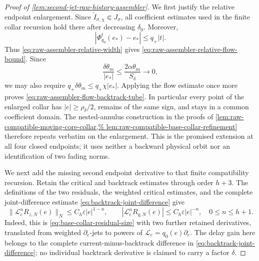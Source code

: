 \begin{proof}[Proof of
\cref{lem:second-jet-raw-history-assembler}]
We first justify the relative endpoint enlargement.  Since
\(\widetilde I_{\sigma,\chi}\Subset J_\sigma\), all coefficient estimates
used in the finite collar recursion hold there after decreasing
\(\delta_0\).  Moreover,
\[
 |\Phi_{q_0}^{t}(e_*)-e_*|\le q_+|t|.
\]
Thus \cref{eq:raw-assembler-relative-width} gives
\cref{eq:raw-assembler-relative-flow-bound}.  Since
\[
 \frac{\delta\theta_m}{|e_*|}
 \le\frac{2\alpha\theta_m}{S_\delta}\longrightarrow0,
\]
we may also require
\(q_+\delta\theta_m\le q_+\chi|e_*|\).  Applying the flow estimate once
more proves
\cref{eq:raw-assembler-flow-backtrack-tube}.  In particular every point of
the enlarged collar has \(|e|\ge\rho_\delta/2\), remains of the same sign,
and stays in a common coefficient domain.  The nested-annulus construction
in the proofs of
\cref{lem:raw-compatible-moving-core-collar,%
lem:raw-compatible-base-collar-refinement}
therefore repeats verbatim on the enlargement.  This is the promised
extension at all four closed endpoints; it uses neither a backward physical
orbit nor an identification of two fading norms.

We next add the missing second endpoint derivative to that finite
compatibility recursion.  Retain the critical and backtrack estimates
through order \(h+3\).  The definitions of the two residuals, the weighted
critical estimates, and the complete joint-difference estimate
\cref{eq:backtrack-joint-difference} give
\begin{equation}
 \|\mathcal L_e^nR_{z,N}(e)\|_N
 \le C_h\varepsilon|e|^{1-n},\qquad
 |\mathcal L_e^nR_{q,N}(e)|
 \le C_h\varepsilon|e|^{-n},
 \quad 0\le n\le h+1.                            \label{eq:second-endpoint-residual-jets}
\end{equation}
Indeed, this is
\cref{eq:base-collar-residual-size} with two further retained derivatives,
translated from weighted \(\partial_e\)-jets to powers of
\(\mathcal L_e=q_0(e)\partial_e\).  The delay gain here belongs to the
complete current-minus-backtrack difference in
\cref{eq:backtrack-joint-difference}; no individual backtrack derivative
is claimed to carry a factor \(\delta\).


\end{proof}
